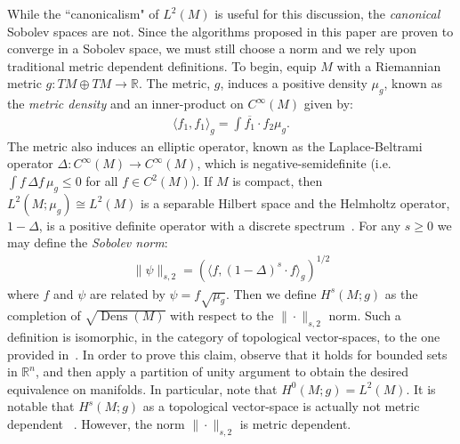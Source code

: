 \documentclass[final,leqno]{siamart}
\DeclareMathOperator{\Dens}{Dens}
\begin{document}
While the ``canonicalism" of $L^{2}(M)$ is useful for this discussion, the \emph{canonical} Sobolev spaces are not.
Since the algorithms proposed in this paper are proven to converge in a Sobolev space, we must still choose a norm and we rely upon traditional metric dependent definitions.  
To begin, equip $M$ with a Riemannian metric $g:TM \oplus TM \to \mathbb{R}$.
The metric, $g$, induces a positive density $\mu_g$, known as the \emph{metric density} and an inner-product on $C^\infty(M)$
given by:
\begin{align}
	\langle f_1 , f_1 \rangle_{g} = \int \overline{f_1} \cdot f_2 \mu_g.
\end{align}
The metric also induces an elliptic operator, known as the Laplace-Beltrami operator $\Delta: C^{\infty}(M) \to C^{\infty}(M)$, which is negative-semidefinite (i.e. $\int f \, \Delta f \, \mu_{g} \leq 0$ for all $f \in C^{2}(M)$).
If $M$ is compact, then $L^2(M ; \mu_g) \cong L^2(M)$ is a separable Hilbert space and the Helmholtz operator, $1 - \Delta$, is a positive definite operator with a discrete spectrum~\cite{Taylor1974}.
For any $s \geq 0$ we may define the \emph{Sobolev norm}:
\begin{align}
	\| \psi \|_{s,2} =  \left( \langle f , (1-\Delta)^s \cdot  f \rangle_{g} \right)^{1/2}
\end{align}
where $f$ and $\psi$ are related by $\psi = f \sqrt{\mu_{g}}$.
Then  we define $H^s(M ;g)$ as the completion of $\sqrt{\Dens(M)}$ with respect to the $\| \cdot \|_{s,2}$ norm.  
Such a definition is isomorphic, in the category of topological vector-spaces, to the one provided in~\cite{Hebey1999}.
In order to prove this claim, observe that it holds for bounded sets in $\mathbb{R}^{n}$, and then apply a partition of unity argument to obtain the desired equivalence on manifolds.
In particular, note that $H^0(M;g) = L^2(M)$.  It is notable that $H^{s}(M;g)$ as a topological vector-space is actually not metric dependent ~\cite[Proposition 2.2]{Hebey1999}.
However, the norm $\| \cdot \|_{s,2}$ is metric dependent.
\end{document}
